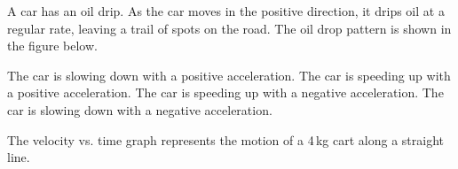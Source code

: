 \documentclass[]{exam}
\begin{document}
\begin{questions}

\question
A car has an oil drip. As the car moves in the positive direction, it drips oil at a regular rate, leaving a trail of spots on the road. The oil drop pattern is shown in the figure below.

\begin{center}
\end{center}

\begin{randomizechoices}
    \choice The car is slowing down with a positive acceleration.
    \choice The car is speeding up with a positive acceleration.
    \choice The car is speeding up with a negative acceleration.
    \correctchoice The car is slowing down with a negative acceleration.
\end{randomizechoices}

\question
The velocity vs. time graph represents the motion of a 4\,kg cart along a straight line.

\begin{center}
\end{center}


\end{questions}
\end{document}
